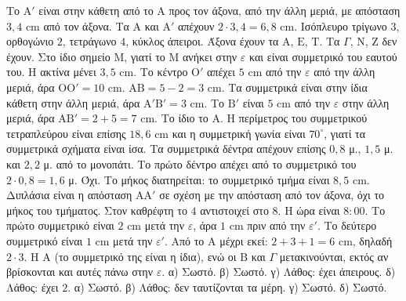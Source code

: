  Το $\mathrm{Α}'$ είναι στην κάθετη από το $\mathrm{Α}$ προς τον άξονα, από την άλλη μεριά, με απόσταση $3{,}4$ cm από τον άξονα. Τα $\mathrm{Α}$ και $\mathrm{Α}'$ απέχουν $2\cdot3{,}4=6{,}8$ cm.
 Ισόπλευρο τρίγωνο $3$, ορθογώνιο $2$, τετράγωνο $4$, κύκλος άπειροι.
 Άξονα έχουν τα $\mathrm{Α}$, $\mathrm{Ε}$, $\mathrm{Τ}$. Τα $\Gamma$, $\mathrm{Ν}$, $\mathrm{Ζ}$ δεν έχουν.
 Στο ίδιο σημείο $\mathrm{Μ}$, γιατί το $\mathrm{Μ}$ ανήκει στην $\varepsilon$ και είναι συμμετρικό του εαυτού του.
 Η ακτίνα μένει $3{,}5$ cm. Το κέντρο $\mathrm{Ο}'$ απέχει $5$ cm από την $\varepsilon$ από την άλλη μεριά, άρα $\mathrm{ΟΟ}'=10$ cm.
 $\mathrm{ΑΒ}=5-2=3$ cm. Τα συμμετρικά είναι στην ίδια κάθετη στην άλλη μεριά, άρα $\mathrm{Α}'\mathrm{Β}'=3$ cm. Το $\mathrm{Β}'$ είναι $5$ cm από την $\varepsilon$ στην άλλη μεριά, άρα $\mathrm{ΑΒ}'=2+5=7$ cm.
 Το ίδιο το $\mathrm{Α}$.
 Η περίμετρος του συμμετρικού τετραπλεύρου είναι επίσης $18{,}6$ cm και η συμμετρική γωνία είναι $70^\circ$, γιατί τα συμμετρικά σχήματα είναι ίσα.
 Τα συμμετρικά δέντρα απέχουν επίσης $0{,}8$ μ., $1{,}5$ μ. και $2{,}2$ μ. από το μονοπάτι. Το πρώτο δέντρο απέχει από το συμμετρικό του $2\cdot0{,}8=1{,}6$ μ.
 Όχι. Το μήκος διατηρείται: το συμμετρικό τμήμα είναι $8{,}5$ cm. Διπλάσια είναι η απόσταση $\mathrm{ΑΑ}'$ σε σχέση με την απόσταση από τον άξονα, όχι το μήκος του τμήματος.
 Στον καθρέφτη το $4$ αντιστοιχεί στο $8$. Η ώρα είναι $8{:}00$.
 Το πρώτο συμμετρικό είναι $2$ cm μετά την $\varepsilon$, άρα $1$ cm πριν από την $\varepsilon'$. Το δεύτερο συμμετρικό είναι $1$ cm μετά την $\varepsilon'$. Από το $\mathrm{Α}$ μέχρι εκεί: $2+3+1=6$ cm, δηλαδή $2\cdot3$.
 Η $\mathrm{Α}$ (το συμμετρικό της είναι η ίδια), ενώ οι $\mathrm{Β}$ και $\Gamma$ μετακινούνται, εκτός αν βρίσκονται και αυτές πάνω στην $\varepsilon$.
 α) Σωστό. β) Σωστό. γ) Λάθος: έχει άπειρους. δ) Λάθος: έχει $2$.
 α) Σωστό. β) Λάθος: δεν ταυτίζονται τα μέρη. γ) Σωστό. δ) Σωστό.
